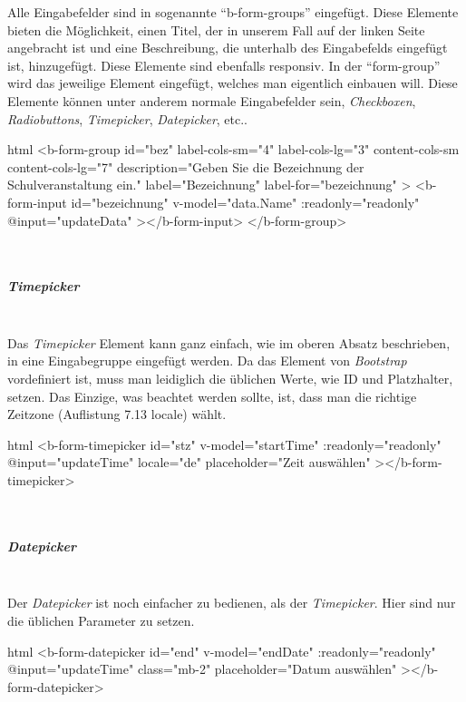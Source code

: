 Alle Eingabefelder sind in sogenannte \enquote{b-form-groups} eingefügt. Diese Elemente bieten die Möglichkeit, einen Titel, der in unserem Fall auf der linken Seite angebracht ist und eine Beschreibung, die unterhalb des Eingabefelds eingefügt ist, hinzugefügt. Diese Elemente sind ebenfalls responsiv. In der \enquote{form-group} wird das jeweilige Element eingefügt, welches man eigentlich einbauen will. Diese Elemente können unter anderem normale Eingabefelder sein, \textit{Checkboxen}, \textit{Radiobuttons}, \textit{Timepicker}, \textit{Datepicker}, etc.. 
\begin{code}{html}
	<b-form-group
        id="bez"
        label-cols-sm="4"
        label-cols-lg="3"
        content-cols-sm
        content-cols-lg="7"
        description="Geben Sie die Bezeichnung der Schulveranstaltung ein."
        label="Bezeichnung"
        label-for="bezeichnung"
    >
        <b-form-input
            id="bezeichnung"
            v-model="data.Name"
            :readonly="readonly"
            @input="updateData"
        ></b-form-input>
    </b-form-group>
\end{code}
~\\
\subparagraph{Timepicker}~\\
Das \textit{Timepicker} Element kann ganz einfach, wie im oberen Absatz beschrieben, in eine Eingabegruppe eingefügt werden. Da das Element von \textit{Bootstrap} vordefiniert ist, muss man leidiglich die üblichen Werte, wie ID und Platzhalter, setzen. Das Einzige, was beachtet werden sollte, ist, dass man die richtige Zeitzone (Auflistung 7.13 locale) wählt.
\begin{code}{html}
	<b-form-timepicker
		id="stz"
		v-model="startTime"
		:readonly="readonly"
		@input="updateTime"
		locale="de"
		placeholder="Zeit auswählen"
  	></b-form-timepicker>
\end{code}
~\\
\subparagraph{Datepicker}~\\
Der \textit{Datepicker} ist noch einfacher zu bedienen, als der \textit{Timepicker}. Hier sind nur die üblichen Parameter zu setzen.
\begin{code}{html}
	<b-form-datepicker
		id="end"
		v-model="endDate"
		:readonly="readonly"
		@input="updateTime"
		class="mb-2"
		placeholder="Datum auswählen"
  	></b-form-datepicker>
\end{code}
	\label{list:bspinputgroup} ~\\
